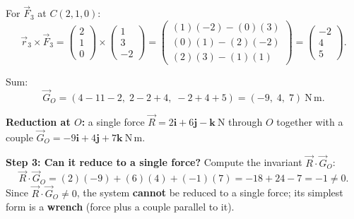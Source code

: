\documentclass[11pt]{article}
\begin{document}
\begin{exoresolu}
For $\vec{F}_3$ at $C(2,1,0)$:
\[
\vec{r}_3 \times \vec{F}_3 =
\begin{pmatrix} 2 \\ 1 \\ 0 \end{pmatrix} \times
\begin{pmatrix} 1 \\ 3 \\ -2 \end{pmatrix} =
\begin{pmatrix} (1)(-2)-(0)(3) \\ (0)(1)-(2)(-2) \\ (2)(3)-(1)(1) \end{pmatrix} =
\begin{pmatrix} -2 \\ 4 \\ 5 \end{pmatrix}.
\]

Sum:
\[
\vec{G}_O = (4 - 11 - 2,\; 2 - 2 + 4,\; -2 + 4 + 5) = (-9,\; 4,\; 7)\ \mathrm{N\,m}.
\]

\textbf{Reduction at $O$:} a single force $\vec{R} = 2\mathbf{i} + 6\mathbf{j} - \mathbf{k}\ \mathrm{N}$ through $O$ together with a couple $\vec{G}_O = -9\mathbf{i} + 4\mathbf{j} + 7\mathbf{k}\ \mathrm{N\,m}$.

\textbf{Step 3: Can it reduce to a single force?} Compute the invariant $\vec{R}\cdot\vec{G}_O$:
\[
\vec{R}\cdot\vec{G}_O = (2)(-9) + (6)(4) + (-1)(7) = -18 + 24 - 7 = -1 \neq 0.
\]
Since $\vec{R}\cdot\vec{G}_O \neq 0$, the system \textbf{cannot} be reduced to a single force; its simplest form is a \textbf{wrench} (force plus a couple parallel to it).


\end{exoresolu}
\end{document}
